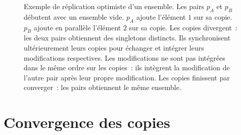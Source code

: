 \begin{figure}[htb]
\newcommand*\hsep{2.2}
\newcommand*\vsep{-1.4}
\centering
{}
\caption[Réplication optimiste d'un ensemble]{Exemple de réplication optimiste d'un ensemble.
Les pairs $p_A$ et $p_B$ débutent avec un ensemble vide.
$p_A$ ajoute l'élément $1$ sur sa copie.
$p_B$ ajoute en parallèle l'élément $2$ sur sa copie.
Les copies divergent~: les deux pairs obtiennent des singletons distincts.
Ils synchronisent ultérieurement leurs copies pour échanger et intégrer leurs modifications respectives.
Les modifications ne sont pas intégrées dans le même ordre sur les copies~: ils intègrent la modification de l'autre pair après leur propre modification.
Les copies finissent par converger~: les pairs obtiennent le même ensemble.}\label{fig:optimistic-replication}
\end{figure}


\section{Convergence des copies}\label{sec:convergence}


